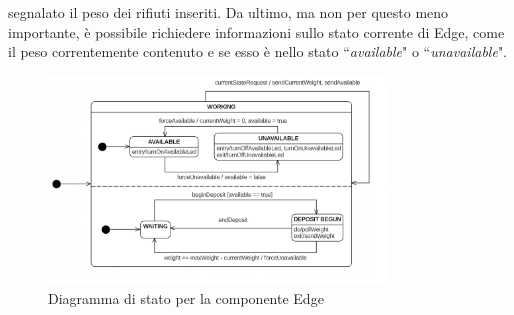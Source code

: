 \documentclass[a4paper, 12pt]{report}
\begin{document}
			segnalato il peso dei rifiuti inseriti. Da ultimo, ma non per questo meno importante, è
			possibile richiedere informazioni sullo stato corrente di Edge, come il peso correntemente
			contenuto e se esso è nello stato ``\textit{available}" o ``\textit{unavailable}".\newline
			\begin{figure}[H]
				\centering
				\includegraphics[width=0.8\textwidth]{"img/EdgeStatechart"}    
				\caption{Diagramma di stato per la componente Edge}
			\end{figure}
\end{document}
